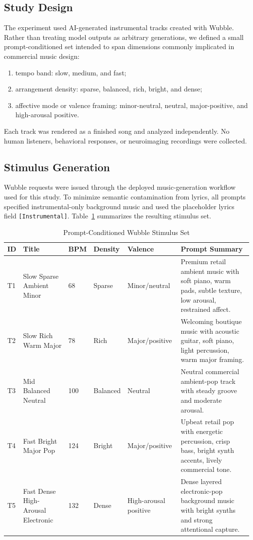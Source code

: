 \documentclass[conference]{IEEEtran}
\begin{document}
\subsection{Study Design}

The experiment used AI-generated instrumental tracks created with Wubble. Rather than treating model outputs as arbitrary generations, we defined a small prompt-conditioned set intended to span dimensions commonly implicated in commercial music design:
\begin{enumerate}
    \item tempo band: slow, medium, and fast;
    \item arrangement density: sparse, balanced, rich, bright, and dense;
    \item affective mode or valence framing: minor-neutral, neutral, major-positive, and high-arousal positive.
\end{enumerate}
Each track was rendered as a finished song and analyzed independently. No human listeners, behavioral responses, or neuroimaging recordings were collected.

\subsection{Stimulus Generation}

Wubble requests were issued through the deployed music-generation workflow used for this study. To minimize semantic contamination from lyrics, all prompts specified instrumental-only background music and used the placeholder lyrics field \texttt{[Instrumental]}. Table~\ref{tab:stimuli} summarizes the resulting stimulus set.

\begin{table}[t]
\centering
\caption{Prompt-Conditioned Wubble Stimulus Set}
\label{tab:stimuli}
\begin{tabular}{p{0.7cm}p{3.2cm}p{1.1cm}p{1.2cm}p{1.5cm}p{8.4cm}}
\toprule
\textbf{ID} & \textbf{Title} & \textbf{BPM} & \textbf{Density} & \textbf{Valence} & \textbf{Prompt Summary} \\
\midrule
T1 & Slow Sparse Ambient Minor & 68 & Sparse & Minor/neutral & Premium retail ambient music with soft piano, warm pads, subtle texture, low arousal, restrained affect. \\
T2 & Slow Rich Warm Major & 78 & Rich & Major/positive & Welcoming boutique music with acoustic guitar, soft piano, light percussion, warm major framing. \\
T3 & Mid Balanced Neutral & 100 & Balanced & Neutral & Neutral commercial ambient-pop track with steady groove and moderate arousal. \\
T4 & Fast Bright Major Pop & 124 & Bright & Major/positive & Upbeat retail pop with energetic percussion, crisp bass, bright synth accents, lively commercial tone. \\
T5 & Fast Dense High-Arousal Electronic & 132 & Dense & High-arousal positive & Dense layered electronic-pop background music with bright synths and strong attentional capture. \\
\bottomrule
\end{tabular}
\end{table}
\end{document}
